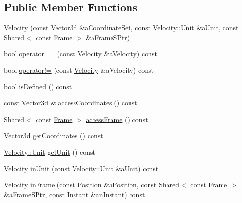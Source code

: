 \subsection*{Public Member Functions}
\begin{DoxyCompactItemize}
\item 
\hyperlink{classostk_1_1physics_1_1coord_1_1_velocity_a2e45f5a6e1025cd21a2f5fa61c6a940a}{Velocity} (const Vector3d \&a\+Coordinate\+Set, const \hyperlink{classostk_1_1physics_1_1coord_1_1_velocity_a01701e56094328a31d0211da5ac1ba28}{Velocity\+::\+Unit} \&a\+Unit, const Shared$<$ const \hyperlink{classostk_1_1physics_1_1coord_1_1_frame}{Frame} $>$ \&a\+Frame\+S\+Ptr)
\item 
bool \hyperlink{classostk_1_1physics_1_1coord_1_1_velocity_abadc0cc438b95d0820aa82603a0cd25b}{operator==} (const \hyperlink{classostk_1_1physics_1_1coord_1_1_velocity}{Velocity} \&a\+Velocity) const
\item 
bool \hyperlink{classostk_1_1physics_1_1coord_1_1_velocity_a83127c62ea6ce9497f57622a2ea3dbf0}{operator!=} (const \hyperlink{classostk_1_1physics_1_1coord_1_1_velocity}{Velocity} \&a\+Velocity) const
\item 
bool \hyperlink{classostk_1_1physics_1_1coord_1_1_velocity_a19318a3cef12b4248cd12e043ee41591}{is\+Defined} () const
\item 
const Vector3d \& \hyperlink{classostk_1_1physics_1_1coord_1_1_velocity_a2c567b0c5a5d2036e5ba8a043ddda598}{access\+Coordinates} () const
\item 
Shared$<$ const \hyperlink{classostk_1_1physics_1_1coord_1_1_frame}{Frame} $>$ \hyperlink{classostk_1_1physics_1_1coord_1_1_velocity_aa2f7454c6f34503989d6adf2e5d581f6}{access\+Frame} () const
\item 
Vector3d \hyperlink{classostk_1_1physics_1_1coord_1_1_velocity_a50636bdf695b2765ea94a5b76258ebc3}{get\+Coordinates} () const
\item 
\hyperlink{classostk_1_1physics_1_1coord_1_1_velocity_a01701e56094328a31d0211da5ac1ba28}{Velocity\+::\+Unit} \hyperlink{classostk_1_1physics_1_1coord_1_1_velocity_ae512730ddb567de93fe9f77e116557a0}{get\+Unit} () const
\item 
\hyperlink{classostk_1_1physics_1_1coord_1_1_velocity}{Velocity} \hyperlink{classostk_1_1physics_1_1coord_1_1_velocity_abafe2a4415f6bee5cdb0abd2c0b7d3dd}{in\+Unit} (const \hyperlink{classostk_1_1physics_1_1coord_1_1_velocity_a01701e56094328a31d0211da5ac1ba28}{Velocity\+::\+Unit} \&a\+Unit) const
\item 
\hyperlink{classostk_1_1physics_1_1coord_1_1_velocity}{Velocity} \hyperlink{classostk_1_1physics_1_1coord_1_1_velocity_aedf31d29406d85a2d302e7a5d51af4f3}{in\+Frame} (const \hyperlink{classostk_1_1physics_1_1coord_1_1_position}{Position} \&a\+Position, const Shared$<$ const \hyperlink{classostk_1_1physics_1_1coord_1_1_frame}{Frame} $>$ \&a\+Frame\+S\+Ptr, const \hyperlink{classostk_1_1physics_1_1time_1_1_instant}{Instant} \&an\+Instant) const

\end{DoxyCompactItemize}
